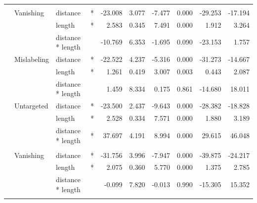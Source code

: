 \documentclass[
]{article}
\begin{document}
\begin{longtable}[t]{llllrrrrrr}
\cmidrule{1-10}\pagebreak[0]
\addlinespace[0.3em]
\multicolumn{10}{l}{\textbf{RetinaNet}}\\
\hspace{1em} & Vanishing & distance & * & -23.008 & 3.077 & -7.477 & 0.000 & -29.253 & -17.194\\
\cmidrule{3-10}\nopagebreak
\hspace{1em} &  & length & * & 2.583 & 0.345 & 7.491 & 0.000 & 1.912 & 3.264\\
\cmidrule{3-10}\nopagebreak
\hspace{1em} &  & distance * length &  & -10.769 & 6.353 & -1.695 & 0.090 & -23.153 & 1.757\\
\cmidrule{2-10}\nopagebreak
\hspace{1em} & Mislabeling & distance & * & -22.522 & 4.237 & -5.316 & 0.000 & -31.273 & -14.667\\
\cmidrule{3-10}\nopagebreak
\hspace{1em} &  & length & * & 1.261 & 0.419 & 3.007 & 0.003 & 0.443 & 2.087\\
\cmidrule{3-10}\nopagebreak
\hspace{1em} &  & distance * length &  & 1.459 & 8.334 & 0.175 & 0.861 & -14.680 & 18.011\\
\cmidrule{2-10}\nopagebreak
\hspace{1em} & Untargeted & distance & * & -23.500 & 2.437 & -9.643 & 0.000 & -28.382 & -18.828\\
\cmidrule{3-10}\nopagebreak
\hspace{1em} &  & length & * & 2.528 & 0.334 & 7.571 & 0.000 & 1.880 & 3.189\\
\cmidrule{3-10}\nopagebreak
\hspace{1em} &  & distance * length & * & 37.697 & 4.191 & 8.994 & 0.000 & 29.615 & 46.048\\
\cmidrule{1-10}\pagebreak[0]
\addlinespace[0.3em]
\multicolumn{10}{l}{\textbf{Faster R-CNN}}\\
\hspace{1em} & Vanishing & distance & * & -31.756 & 3.996 & -7.947 & 0.000 & -39.875 & -24.217\\
\cmidrule{3-10}\nopagebreak
\hspace{1em} &  & length & * & 2.075 & 0.360 & 5.770 & 0.000 & 1.375 & 2.785\\
\cmidrule{3-10}\nopagebreak
\hspace{1em} &  & distance * length &  & -0.099 & 7.820 & -0.013 & 0.990 & -15.305 & 15.352\\
\cmidrule{2-10}\nopagebreak

\end{longtable}
\end{document}

